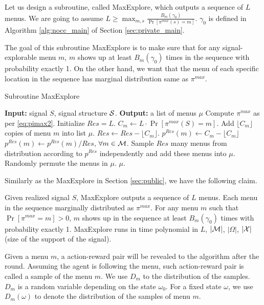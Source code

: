 Let us design a subroutine, called  MaxExplore, which outputs a sequence of $L$ menus. We are going to assume $L \geq \max_{m,s} \frac{B_m(\gamma_0)}{ \Pr[\pi^{max}(s)=m]}$. $\gamma_0$ is defined in Algorithm \ref{alg:nocc_main} of Section \ref{sec:private_main}.

The goal of this subroutine MaxExplore is to make sure that for any signal-explorable menu $m$, $m$ shows up at least $B_m(\gamma_0)$ times in the sequence with probability exactly 1. On the other hand, we want that the menu of each specific location in the sequence has marginal distribution same as $\pi^{max}$.

 \begin{algorithm}[H]
    \caption{Subroutine MaxExplore}
    	\label{alg:nocc_explore}
    \begin{algorithmic}[1]
	\STATE \textbf{Input:} signal $S$, signal structure $\S$.
	\STATE \textbf{Output:} a list of menus $\mu$
	\STATE Compute $\pi^{max}$ as per \eqref{eq:pimax2}.
		\STATE Initialize $Res = L$.
			\STATE $C_m \leftarrow L \cdot \Pr[\pi^{max}(S) = m]$.
                     		\STATE Add $\lfloor C_m\rfloor$ copies of menu $m$ into list $\mu$.
			\STATE $Res \leftarrow Res -\lfloor C_m \rfloor $.
			\STATE $p^{Res}(m)\leftarrow  C_m -  \lfloor C_m\rfloor$
		\ENDFOR
		\STATE $p^{Res}(m) \leftarrow p^{Res}(m) / Res$, $\forall m \in \M$.
		\STATE Sample $Res$ many menus from distribution according to $p^{Res}$ independently and add these menus into $\mu$.
		\STATE Randomly permute the menus in $\mu$.
	\RETURN $\mu$.	
     \end{algorithmic}
\end{algorithm}

Similarly as the MaxExplore in Section \ref{sec:public}, we have the following claim.
\begin{claim}
\label{clm:maxexplore_nocc}
Given realized signal $S$, MaxExplore outputs a sequence of $L$ menus. Each menu in the sequence marginally distributed as $\pi^{max}$. For any menu $m$ such that $\Pr[\pi^{max} = m] >0$, $m$ shows up in the sequence at least $B_m(\gamma_0)$ times with probability exactly 1. MaxExplore runs in time polynomial in $L$, $|\M|$, $|\varOmega|$, $|\X|$ (size of the support of the signal).
\end{claim}

Given a menu $m$, a action-reward pair will be revealed to the algorithm after the round. Assuming the agent is following the menu, such action-reward pair is called a sample of the menu $m$. We use $D_m$ to the distribution of the samples. $D_m$ is a random variable depending on the state $\omega_0$. For a fixed state $\omega$, we use $D_m(\omega)$ to denote the distribution of the samples of menu $m$.

